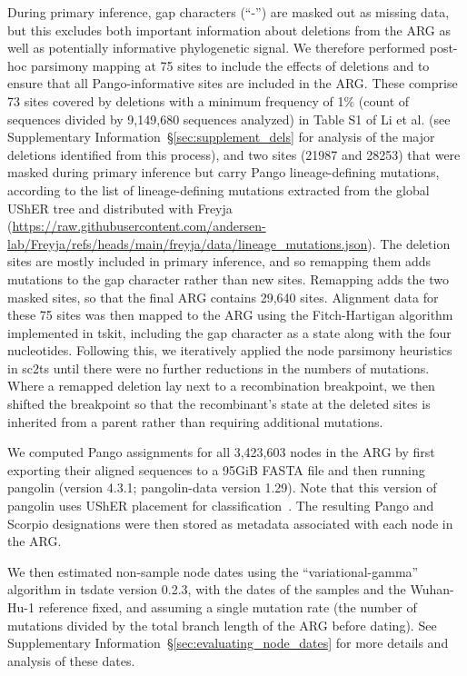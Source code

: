 \documentclass[12pt]{article}
\newcommand{\supref}[1]{Supplementary Information~\S\ref{#1}}
\begin{document}
During primary inference, gap characters (``-'') are masked
out as missing data, but this excludes both important information
about deletions from the ARG as well as potentially informative
phylogenetic signal.
We therefore performed post-hoc parsimony mapping at 75 sites to include
the effects of deletions and to ensure that all Pango-informative
sites are included in the ARG.
These comprise 73 sites covered by deletions with a minimum frequency of 1\%
(count of sequences divided by 9,149,680 sequences analyzed)
in Table S1 of Li et al.\cite{Li2023indels}
(see \supref{sec:supplement_dels}
for analysis of the major deletions identified from this process),
and two sites (21987 and 28253) that were masked during primary
inference but carry Pango lineage-defining mutations, according to the
list of lineage-defining mutations extracted from the global
UShER tree\cite{Turakhia2021} and distributed with
Freyja\cite{Karthikeyan2022}
(\url{https://raw.githubusercontent.com/andersen-lab/Freyja/refs/heads/main/freyja/data/lineage\_mutations.json}).
The deletion sites are mostly included in primary inference, and so
remapping them adds mutations to the gap character
rather than new sites.
Remapping adds the two masked sites,
so that the final ARG contains 29,640 sites.
Alignment data for these 75 sites was then mapped to the
ARG using the Fitch-Hartigan algorithm\cite{Fitch1971toward,Hartigan1973minimum}
implemented in tskit, including the gap character as a state
along with the four nucleotides.
Following this, we iteratively applied the node parsimony
heuristics in sc2ts until there were no further reductions in
the numbers of mutations.
Where a remapped deletion lay next to a recombination breakpoint,
we then shifted the breakpoint so that the recombinant's state
at the deleted sites is inherited from a parent rather than
requiring additional mutations.

We computed Pango assignments for all 3,423,603 nodes in the ARG by first
exporting their aligned sequences to a 95GiB FASTA file and
then running pangolin (version 4.3.1; pangolin-data version 1.29).
Note that this version of pangolin uses UShER placement
for classification~\cite{McBroome2024}.
The resulting Pango and Scorpio designations were then stored as
metadata associated with each node in the ARG.

We then estimated non-sample node dates using
the ``variational-gamma'' algorithm in tsdate\cite{Wohns2022,Pope2025}
version 0.2.3, with the dates of the samples and the Wuhan-Hu-1
reference fixed, and assuming a single mutation rate
(the number of mutations divided by the total branch length
of the ARG before dating). See \supref{sec:evaluating_node_dates} for
more details and analysis of these dates.
\end{document}
